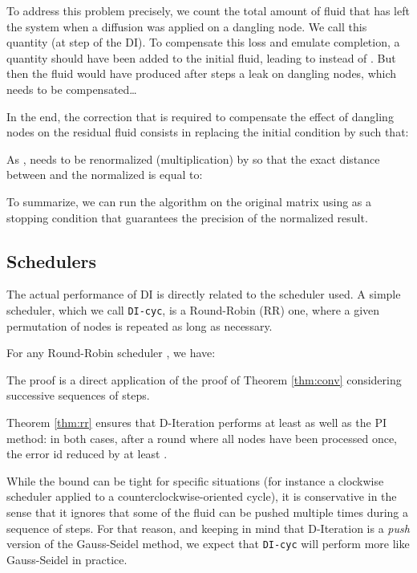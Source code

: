 \documentclass{llncs}
\begin{document}
To address this problem precisely, we count the total amount of fluid that has left the system when a diffusion was applied on a dangling node. We call this quantity  (at step  of the DI). To compensate this loss and emulate completion, a quantity  should have been added to the initial fluid, leading to  instead of . But then the fluid  would have produced after  steps a leak  on dangling nodes, which needs to be compensated\ldots 

In the end, the correction that is required to compensate the effect of dangling nodes on the residual fluid  consists in replacing the initial condition  by   such that:
\begin{center}

\end{center}

As ,  needs to be renormalized (multiplication) by  so that the exact  distance between  and the normalized  is equal to:


To summarize, we can run the algorithm on the original matrix using 
 as a stopping condition that guarantees the precision of the normalized result.


\subsection{Schedulers}

The actual performance of DI is directly related to the scheduler used. A simple scheduler, which we call \texttt{DI-cyc}, is a Round-Robin (RR) one, where a given permutation of nodes is repeated as long as necessary.

\begin{theorem}
\label{thm:rr}
For any Round-Robin scheduler , we have: 


\end{theorem}

The proof is a direct application of the proof of Theorem \ref{thm:conv} considering successive sequences of  steps.


Theorem \ref{thm:rr} ensures that D-Iteration performs at least as well as the PI method: in both cases, after a round where all nodes have been processed once, the error id reduced by at least .

While the bound can be tight for specific situations (for instance a clockwise scheduler applied to a counterclockwise-oriented cycle), it is conservative in the sense that it ignores that some of the fluid can be pushed multiple times during a sequence of  steps. For that reason, and keeping in mind that D-Iteration is a \emph{push} version of the Gauss-Seidel method, we expect that  \texttt{DI-cyc} will perform more like Gauss-Seidel in practice.
\end{document}
